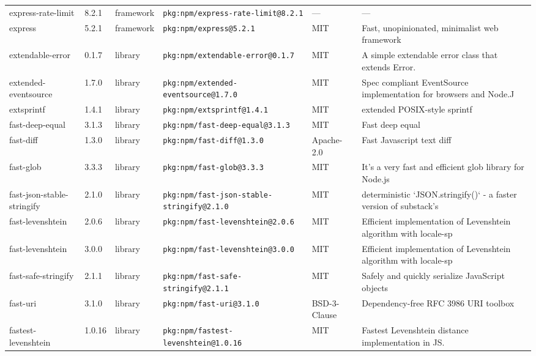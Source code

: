 \documentclass[11pt,a4paper]{article}
\begin{document}
\begin{longtable}{|p{4cm}|p{2cm}|p{1.6cm}|p{5cm}|p{1.5cm}|p{3.5cm}|}
\raggedright express-rate-limit & 8.2.1 & framework & \small\texttt{pkg:npm/express-rate-limit@8.2.1} & — & \small — \\
\raggedright express & 5.2.1 & framework & \small\texttt{pkg:npm/express@5.2.1} & MIT & \small Fast, unopinionated, minimalist web framework \\
\raggedright extendable-error & 0.1.7 & library & \small\texttt{pkg:npm/extendable-error@0.1.7} & MIT & \small A simple extendable error class that extends Error. \\
\raggedright extended-eventsource & 1.7.0 & library & \small\texttt{pkg:npm/extended-eventsource@1.7.0} & MIT & \small Spec compliant EventSource implementation for browsers and Node.J \\
\raggedright extsprintf & 1.4.1 & library & \small\texttt{pkg:npm/extsprintf@1.4.1} & MIT & \small extended POSIX-style sprintf \\
\raggedright fast-deep-equal & 3.1.3 & library & \small\texttt{pkg:npm/fast-deep-equal@3.1.3} & MIT & \small Fast deep equal \\
\raggedright fast-diff & 1.3.0 & library & \small\texttt{pkg:npm/fast-diff@1.3.0} & Apache-2.0 & \small Fast Javascript text diff \\
\raggedright fast-glob & 3.3.3 & library & \small\texttt{pkg:npm/fast-glob@3.3.3} & MIT & \small It's a very fast and efficient glob library for Node.js \\
\raggedright fast-json-stable-stringify & 2.1.0 & library & \small\texttt{pkg:npm/fast-json-stable-stringify@2.1.0} & MIT & \small deterministic `JSON.stringify()` - a faster version of substack's \\
\raggedright fast-levenshtein & 2.0.6 & library & \small\texttt{pkg:npm/fast-levenshtein@2.0.6} & MIT & \small Efficient implementation of Levenshtein algorithm  with locale-sp \\
\raggedright fast-levenshtein & 3.0.0 & library & \small\texttt{pkg:npm/fast-levenshtein@3.0.0} & MIT & \small Efficient implementation of Levenshtein algorithm  with locale-sp \\
\raggedright fast-safe-stringify & 2.1.1 & library & \small\texttt{pkg:npm/fast-safe-stringify@2.1.1} & MIT & \small Safely and quickly serialize JavaScript objects \\
\raggedright fast-uri & 3.1.0 & library & \small\texttt{pkg:npm/fast-uri@3.1.0} & BSD-3-Clause & \small Dependency-free RFC 3986 URI toolbox \\
\raggedright fastest-levenshtein & 1.0.16 & library & \small\texttt{pkg:npm/fastest-levenshtein@1.0.16} & MIT & \small Fastest Levenshtein distance implementation in JS. \\

\end{longtable}
\end{document}
